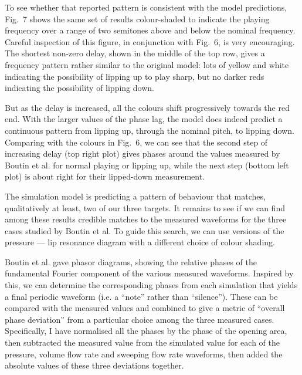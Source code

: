 
  To see whether that reported pattern is consistent with the model 
  predictions, Fig.\ 7 shows the same set of results colour-shaded to indicate 
  the playing frequency over a range of two semitones above and below the 
  nominal frequency. Careful inspection of this figure, in conjunction with 
  Fig.\ 6, is very encouraging. The shortest non-zero delay, shown in the 
  middle of the top row, gives a frequency pattern rather similar to the 
  original model: lots of yellow and white indicating the possibility of 
  lipping up to play sharp, but no darker reds indicating the possibility of 
  lipping down. 


  But as the delay is increased, all the colours shift progressively towards 
  the red end. With the larger values of the phase lag, the model does indeed 
  predict a continuous pattern from lipping up, through the nominal pitch, to 
  lipping down. Comparing with the colours in Fig.\ 6, we can see that the 
  second step of increasing delay (top right plot) gives phases around the 
  values measured by Boutin et al. for normal playing or lipping up, while the 
  next step (bottom left plot) is about right for their lipped-down 
  measurement. 

  The simulation model is predicting a pattern of behaviour that matches, 
  qualitatively at least, two of our three targets. It remains to see if we can 
  find among these results credible matches to the measured waveforms for the 
  three cases studied by Boutin et al. To guide this search, we can use 
  versions of the pressure --- lip resonance diagram with a different choice of 
  colour shading. 

  Boutin et al. gave phasor diagrams, showing the relative phases of the 
  fundamental Fourier component of the various measured waveforms. Inspired by 
  this, we can determine the corresponding phases from each simulation that 
  yields a final periodic waveform (i.e. a ``note'' rather than ``silence''). 
  These can be compared with the measured values and combined to give a metric 
  of ``overall phase deviation'' from a particular choice among the three 
  measured cases. Specifically, I have normalised all the phases by the phase 
  of the opening area, then subtracted the measured value from the simulated 
  value for each of the pressure, volume flow rate and sweeping flow rate 
  waveforms, then added the absolute values of these three deviations together. 

